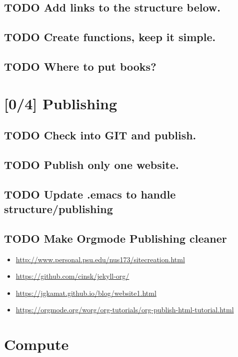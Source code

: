 \documentclass[11pt]{article}
\begin{document}
\subsection{{\bfseries\sffamily TODO} Add links to the structure below.}
\label{sec:org5d64f8a}
\subsection{{\bfseries\sffamily TODO} Create functions, keep it simple.}
\label{sec:org6d336a9}
\subsection{{\bfseries\sffamily TODO} Where to put books?}
\label{sec:org16971cb}

\section{[0/4] Publishing}
\label{sec:org827e4be}
\subsection{{\bfseries\sffamily TODO} Check into GIT and publish.}
\label{sec:org7535606}
\subsection{{\bfseries\sffamily TODO} Publish only one website.}
\label{sec:org34fc760}
\subsection{{\bfseries\sffamily TODO} Update .emacs to handle structure/publishing}
\label{sec:org926cfec}
\subsection{{\bfseries\sffamily TODO} Make Orgmode Publishing cleaner}
\label{sec:org72e6c5e}
\begin{itemize}
\item \url{http://www.personal.psu.edu/nus173/sitecreation.html}
\item \url{https://github.com/cinsk/jekyll-org/}
\item \url{https://jgkamat.github.io/blog/website1.html}
\item \url{https://orgmode.org/worg/org-tutorials/org-publish-html-tutorial.html}
\end{itemize}

\section{Compute}
\label{sec:orga68d835}
\end{document}
